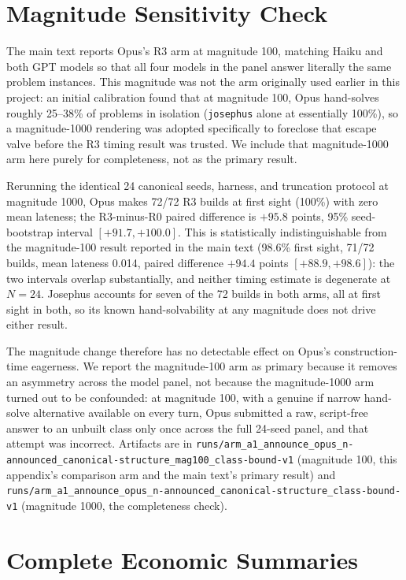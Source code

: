 \documentclass{article}
\begin{document}
\section{Magnitude Sensitivity Check}
\label{app:magnitude-sensitivity}

The main text reports Opus's R3 arm at magnitude 100, matching Haiku and both
GPT models so that all four models in the panel answer literally the same
problem instances. This magnitude was not the arm originally used earlier in
this project: an initial calibration found that at magnitude 100, Opus hand-solves
roughly 25--38\% of problems in isolation (\texttt{josephus} alone at
essentially 100\%), so a magnitude-1000 rendering was adopted specifically to
foreclose that escape valve before the R3 timing result was trusted. We
include that magnitude-1000 arm here purely for completeness, not as the
primary result.

Rerunning the identical 24 canonical seeds, harness, and truncation protocol at
magnitude 1000, Opus makes 72/72 R3 builds at first sight (100\%) with zero
mean lateness; the R3-minus-R0 paired difference is $+95.8$ points, 95\%
seed-bootstrap interval $[+91.7,+100.0]$. This is statistically indistinguishable
from the magnitude-100 result reported in the main text (98.6\% first sight,
71/72 builds, mean lateness 0.014, paired difference $+94.4$ points
$[+88.9,+98.6]$): the two intervals overlap substantially, and neither timing
estimate is degenerate at $N=24$. Josephus accounts for seven of the 72 builds
in both arms, all at first sight in both, so its known hand-solvability at any
magnitude does not drive either result.

The magnitude change therefore has no detectable effect on Opus's
construction-time eagerness. We report the magnitude-100 arm as primary
because it removes an asymmetry across the model panel, not because the
magnitude-1000 arm turned out to be confounded: at magnitude 100, with a
genuine if narrow hand-solve alternative available on every turn, Opus
submitted a raw, script-free answer to an unbuilt class only once across the
full 24-seed panel, and that attempt was incorrect. Artifacts are in
\texttt{runs/arm\_a1\_announce\_opus\_n-announced\_canonical-structure\_mag100\_class-bound-v1}
(magnitude 100, this appendix's comparison arm and the main text's primary
result) and
\texttt{runs/arm\_a1\_announce\_opus\_n-announced\_canonical-structure\_class-bound-v1}
(magnitude 1000, the completeness check).

\section{Complete Economic Summaries}
\label{app:economic}
\end{document}
